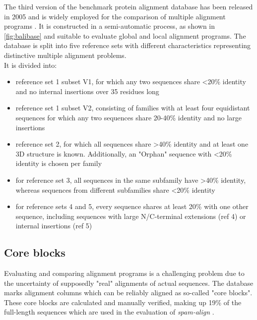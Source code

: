 The third version of the \bb benchmark protein alignment database has been released in 2005 and is widely employed for the comparison of multiple alignment programs \cite{thompson2005balibase, Russell2016}. It is constructed in a semi-automatic process, as shown in \cref{fig:balibase} and suitable to evaluate global and local alignment programs. The database is split into five reference sets with different characteristics representing distinctive multiple alignment problems. \\
It is divided into:



\begin{itemize}
	\item reference set 1 subset V1, for which any two sequences share <20\% identity and no internal insertions over 35 residues long
	\item reference set 1 subset V2, consisting of families with at least four equidistant sequences for which any two sequences share 20-40\% identity and no large insertions
	\item reference set 2, for which all sequences share >40\% identity and at least one 3D structure is known. Additionally, an "Orphan" sequence with <20\% identity is chosen per family
	\item for reference set 3, all sequences in the same subfamily have >40\% identity, whereas sequences from different subfamilies share <20\% identity
	\item for reference sets 4 and 5, every sequence shares at least 20\% with one other sequence, including sequences with large N/C-terminal extensions (ref 4) or internal insertions (ref 5)
\end{itemize}

\subsection{Core blocks}

Evaluating and comparing alignment programs is a challenging problem due to the uncertainty of supposedly "real" alignments of actual sequences. The \bb database marks alignment columns which can be reliably aligned as so-called "core blocks". These core blocks are calculated and manually verified, making up 19\% of the full-length sequences which are used in the evaluation of \textit{spam-align} \cite{thompson2005balibase}.


